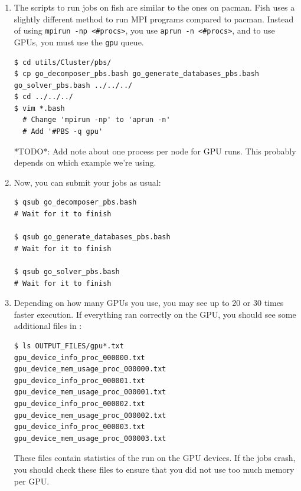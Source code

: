 \documentclass[10pt,fleqn,letterpaper]{article}
\begin{document}
\begin{enumerate}
\item The scripts to run jobs on fish are similar to the ones on pacman. Fish
      uses a slightly different method to run MPI programs compared to pacman.
      Instead of using \lstinline{mpirun -np <#procs>}, you use
      \lstinline{aprun -n <#procs>}, and to use GPUs, you must use the \texttt{gpu}
      queue.
\begin{lstlisting}
$ cd utils/Cluster/pbs/
$ cp go_decomposer_pbs.bash go_generate_databases_pbs.bash go_solver_pbs.bash ../../../
$ cd ../../../
$ vim *.bash
  # Change 'mpirun -np' to 'aprun -n'
  # Add '#PBS -q gpu'
\end{lstlisting}
*TODO*: Add note about one process per node for GPU runs. This probably depends
on which example we're using.

\item Now, you can submit your jobs as usual:
\begin{lstlisting}
$ qsub go_decomposer_pbs.bash
# Wait for it to finish

$ qsub go_generate_databases_pbs.bash
# Wait for it to finish

$ qsub go_solver_pbs.bash
# Wait for it to finish
\end{lstlisting}

\item Depending on how many GPUs you use, you may see up to 20 or 30 times
      faster execution. If everything ran correctly on the GPU, you should see
      some additional files in :
\begin{lstlisting}
$ ls OUTPUT_FILES/gpu*.txt
gpu_device_info_proc_000000.txt
gpu_device_mem_usage_proc_000000.txt
gpu_device_info_proc_000001.txt
gpu_device_mem_usage_proc_000001.txt
gpu_device_info_proc_000002.txt
gpu_device_mem_usage_proc_000002.txt
gpu_device_info_proc_000003.txt
gpu_device_mem_usage_proc_000003.txt
\end{lstlisting}

      These files contain statistics of the run on the GPU devices. If the jobs
      crash, you should check these files to ensure that you did not use too
      much memory per GPU.
\end{enumerate}


%
%

\end{document}
